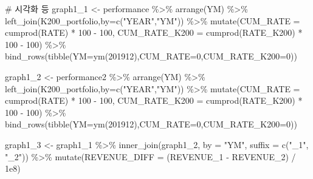 \documentclass[
  a4paper,
  DIV=11,
  numbers=noendperiod]{scrreprt}
\newenvironment{Shaded}{\begin{snugshade}}{\end{snugshade}}
\newcommand{\AttributeTok}[1]{\textcolor[rgb]{0.40,0.45,0.13}{#1}}
\newcommand{\CommentTok}[1]{\textcolor[rgb]{0.37,0.37,0.37}{#1}}
\newcommand{\DecValTok}[1]{\textcolor[rgb]{0.68,0.00,0.00}{#1}}
\newcommand{\FloatTok}[1]{\textcolor[rgb]{0.68,0.00,0.00}{#1}}
\newcommand{\FunctionTok}[1]{\textcolor[rgb]{0.28,0.35,0.67}{#1}}
\newcommand{\NormalTok}[1]{\textcolor[rgb]{0.00,0.23,0.31}{#1}}
\newcommand{\OtherTok}[1]{\textcolor[rgb]{0.00,0.23,0.31}{#1}}
\newcommand{\SpecialCharTok}[1]{\textcolor[rgb]{0.37,0.37,0.37}{#1}}
\newcommand{\StringTok}[1]{\textcolor[rgb]{0.13,0.47,0.30}{#1}}
\begin{document}
\begin{Shaded}
\begin{Highlighting}[]
\CommentTok{\# 시각화 등}
\NormalTok{graph1\_1 }\OtherTok{\textless{}{-}}\NormalTok{ performance }\SpecialCharTok{\%\textgreater{}\%}
  \FunctionTok{arrange}\NormalTok{(YM) }\SpecialCharTok{\%\textgreater{}\%}
  \FunctionTok{left\_join}\NormalTok{(K200\_portfolio,}\AttributeTok{by=}\FunctionTok{c}\NormalTok{(}\StringTok{"YEAR"}\NormalTok{,}\StringTok{"YM"}\NormalTok{)) }\SpecialCharTok{\%\textgreater{}\%} 
  \FunctionTok{mutate}\NormalTok{(}\AttributeTok{CUM\_RATE =} \FunctionTok{cumprod}\NormalTok{(RATE) }\SpecialCharTok{*} \DecValTok{100} \SpecialCharTok{{-}} \DecValTok{100}\NormalTok{,}
         \AttributeTok{CUM\_RATE\_K200 =} \FunctionTok{cumprod}\NormalTok{(RATE\_K200) }\SpecialCharTok{*} \DecValTok{100} \SpecialCharTok{{-}} \DecValTok{100}\NormalTok{) }\SpecialCharTok{\%\textgreater{}\%} 
  \FunctionTok{bind\_rows}\NormalTok{(}\FunctionTok{tibble}\NormalTok{(}\AttributeTok{YM=}\FunctionTok{ym}\NormalTok{(}\DecValTok{201912}\NormalTok{),}\AttributeTok{CUM\_RATE=}\DecValTok{0}\NormalTok{,}\AttributeTok{CUM\_RATE\_K200=}\DecValTok{0}\NormalTok{))}
  

\NormalTok{graph1\_2 }\OtherTok{\textless{}{-}}\NormalTok{ performance2 }\SpecialCharTok{\%\textgreater{}\%}
  \FunctionTok{arrange}\NormalTok{(YM) }\SpecialCharTok{\%\textgreater{}\%}
  \FunctionTok{left\_join}\NormalTok{(K200\_portfolio,}\AttributeTok{by=}\FunctionTok{c}\NormalTok{(}\StringTok{"YEAR"}\NormalTok{,}\StringTok{"YM"}\NormalTok{)) }\SpecialCharTok{\%\textgreater{}\%} 
  \FunctionTok{mutate}\NormalTok{(}\AttributeTok{CUM\_RATE =} \FunctionTok{cumprod}\NormalTok{(RATE) }\SpecialCharTok{*} \DecValTok{100} \SpecialCharTok{{-}} \DecValTok{100}\NormalTok{,}
         \AttributeTok{CUM\_RATE\_K200 =} \FunctionTok{cumprod}\NormalTok{(RATE\_K200) }\SpecialCharTok{*} \DecValTok{100} \SpecialCharTok{{-}} \DecValTok{100}\NormalTok{) }\SpecialCharTok{\%\textgreater{}\%} 
  \FunctionTok{bind\_rows}\NormalTok{(}\FunctionTok{tibble}\NormalTok{(}\AttributeTok{YM=}\FunctionTok{ym}\NormalTok{(}\DecValTok{201912}\NormalTok{),}\AttributeTok{CUM\_RATE=}\DecValTok{0}\NormalTok{,}\AttributeTok{CUM\_RATE\_K200=}\DecValTok{0}\NormalTok{))}

\NormalTok{graph1\_3 }\OtherTok{\textless{}{-}}\NormalTok{ graph1\_1 }\SpecialCharTok{\%\textgreater{}\%}
  \FunctionTok{inner\_join}\NormalTok{(graph1\_2, }\AttributeTok{by =} \StringTok{"YM"}\NormalTok{, }\AttributeTok{suffix =} \FunctionTok{c}\NormalTok{(}\StringTok{"\_1"}\NormalTok{, }\StringTok{"\_2"}\NormalTok{)) }\SpecialCharTok{\%\textgreater{}\%}
  \FunctionTok{mutate}\NormalTok{(}\AttributeTok{REVENUE\_DIFF =}\NormalTok{ (REVENUE\_1 }\SpecialCharTok{{-}}\NormalTok{ REVENUE\_2) }\SpecialCharTok{/} \FloatTok{1e8}\NormalTok{)}


\end{Highlighting}
\end{Shaded}
\end{document}
